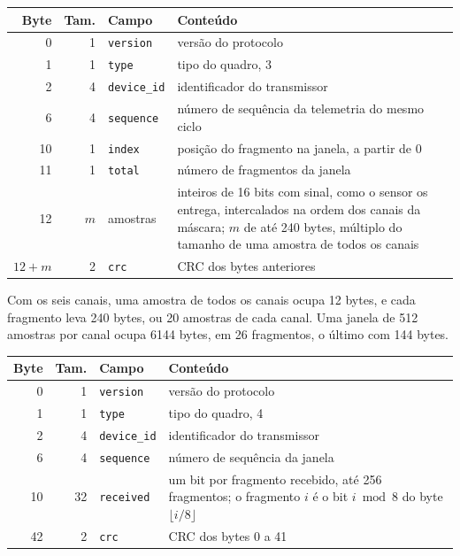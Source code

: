 \begin{quadro}[!htbp]
\centering\small
\caption{Campos do fragmento da janela}\label{tab:ap-fragmento}
\begin{tabular}{@{}rr>{\raggedright\arraybackslash}p{38mm}>{\raggedright\arraybackslash}p{78mm}@{}}
\toprule
Byte & Tam. & Campo & Conteúdo \\
\midrule
0 & 1 & \texttt{version} & versão do protocolo \\
1 & 1 & \texttt{type} & tipo do quadro, 3 \\
2 & 4 & \texttt{device\_id} & identificador do transmissor \\
6 & 4 & \texttt{sequence} & número de sequência da telemetria do mesmo ciclo \\
10 & 1 & \texttt{index} & posição do fragmento na janela, a partir de 0 \\
11 & 1 & \texttt{total} & número de fragmentos da janela \\
12 & $m$ & amostras & inteiros de 16 bits com sinal, como o sensor os entrega, intercalados na ordem dos canais da máscara; $m$ de até 240 bytes, múltiplo do tamanho de uma amostra de todos os canais \\
$12+m$ & 2 & \texttt{crc} & CRC dos bytes anteriores \\
\bottomrule
\end{tabular}
\end{quadro}

Com os seis canais, uma amostra de todos os canais ocupa 12 bytes, e cada fragmento leva 240 bytes, ou 20 amostras de cada canal. Uma janela de 512 amostras por canal ocupa \num{6144} bytes, em 26 fragmentos, o último com 144 bytes.

\begin{quadro}[!htbp]
\centering\small
\caption{Campos do mapa da rajada, de 44 bytes}\label{tab:ap-mapa}
\begin{tabular}{@{}rr>{\raggedright\arraybackslash}p{38mm}>{\raggedright\arraybackslash}p{78mm}@{}}
\toprule
Byte & Tam. & Campo & Conteúdo \\
\midrule
0 & 1 & \texttt{version} & versão do protocolo \\
1 & 1 & \texttt{type} & tipo do quadro, 4 \\
2 & 4 & \texttt{device\_id} & identificador do transmissor \\
6 & 4 & \texttt{sequence} & número de sequência da janela \\
10 & 32 & \texttt{received} & um bit por fragmento recebido, até 256 fragmentos; o fragmento $i$ é o bit $i \bmod 8$ do byte $\lfloor i/8 \rfloor$ \\
42 & 2 & \texttt{crc} & CRC dos bytes 0 a 41 \\
\bottomrule
\end{tabular}
\end{quadro}
